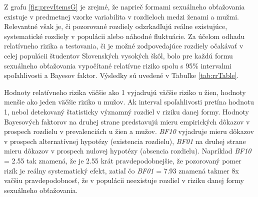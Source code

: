 \documentclass[
]{article}
\begin{document}
Z grafu \ref{fig:prevItemsG} je zrejmé, že naprieč formami sexuálneho obťažovania existuje v predmetnej vzorke variabilita v rozdieloch medzi ženami a mužmi. Relevantné však je, či pozorované rozdiely odzrkadľujú reálne existujúce, systematické rozdiely v populácii alebo náhodné fluktuácie. Za účelom odhadu relatívneho rizika a testovania, či je možné zodpovedajúce rozdiely očakávať v celej populácii študentov Slovenských vysokých škôl, bolo pre každú formu sexuálneho obťažovania vypočítané relatívne riziko spolu s 95\% intervalmi spoľahlivosti a Bayesov faktor. Výsledky sú uvedené v Tabuľke \ref{tab:rrTable}.

Hodnoty relatívneho rizika väčšie ako 1 vyjadrujú väčšie riziko u žien, hodnoty menšie ako jeden väčšie riziko u mužov. Ak interval spoľahlivosti pretína hodnotu 1, nebol detekovaný štatisticky významný rozdiel v riziku danej formy. Hodnoty Bayesových faktorov na druhej strane predstavujú mieru empirických dôkazov v prospech rozdielu v prevalenciách u žien a mužov. \emph{BF10} vyjadruje mieru dôkazov v prospech alternatívnej hypotézy (existencia rozdielu), \emph{BF01} na druhej strane mieru dôkazov v prospech nulovej hypotézy (absencia rozdielu). Napríklad \emph{BF10} = 2.55 tak znamená, že je 2.55 krát pravdepodobnejšie, že pozorovaný pomer rizík je reálny systematický efekt, zatiaľ čo \emph{BF01} = 7.93 znamená takmer 8x vačšiu pravdepodobnosť, že v populácii neexistuje rozdiel v riziku danej formy sexuálneho obťažovania.
\end{document}
